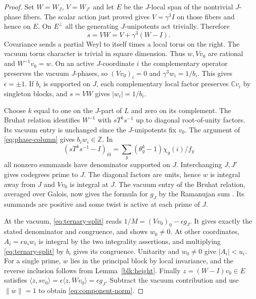 \documentclass[11pt]{amsart}
\numberwithin{equation}{section}
\theoremstyle{definition}
\theoremstyle{plain}
\begin{document}
\begin{proof}
Set $W=W_J$, $V=W_{J'}$ and let $E$ be the $J$-local span of
the nontrivial $J$-phase fibers. The scalar action just proved gives
$V=\gamma^3 I$ on those fibers and hence on $E$. On $E^\perp$ all
the generating $J$-unipotents act trivially. Therefore
\begin{equation}\label{eq:ternary-split}
 s=VW=V+\gamma^3(W-I).
\end{equation}
Covariance sends a partial Weyl to itself times a local torus on the
right. The vacuum torus character is trivial in square dimension.
Thus $w,Vv_0$ are rational and $W^{-1}v_0=w$. On an active
$J$-coordinate $i$ the complementary operator preserves the vacuum
$J$-phases, so $(Vv_0)_i=0$ and $\gamma^3 w_i=1/b_i$. This gives
$\epsilon=\pm1$. If $b_i$ is supported on $J$, each complementary
local factor preserves $\mathbb C v_i$ by singleton blocks, and
$s=VW$ gives $|w_i|=1/b_i$.

Choose $k$ equal to one on the $J$-part of $L$ and zero on its
complement. The Bruhat relation identifies $W^{-1}$ with
$sT^ks^{-1}$ up to diagonal root-of-unity factors. Its vacuum entry
is unchanged since the $J$-unipotents fix $v_0$. The argument
of \eqref{eq:phase-column} gives $b_iw_i\in\mathbb Z$. In
\[
 (sT^ks^{-1}-I)_{i0}=\sum_y(\theta_y^k-1)\chi_y(i)/f_y
\]
all nonzero summands have denominator supported on $J$.
Interchanging $J,J'$ gives codegrees prime to $J$. The diagonal
factors are units, hence $w$ is integral away from $J$ and $Vv_0$
is integral at $J$. The vacuum entry of the Bruhat relation, averaged
over Galois, now gives the formula for $g_J$ by the Ramanujan sum
\cite[Theorem~8.6]{Apostol}. Its summands are positive and some
twist is active at each prime of $J$.

At the vacuum, \eqref{eq:ternary-split} reads
$1/M=(Vv_0)_0-\epsilon g_J$. It gives exactly the stated denominator
and congruence, and shows $w_0\ne0$. At other coordinates,
$A_i=\epsilon u_iw_i$ is integral by the two integrality assertions,
and multiplying \eqref{eq:ternary-split} by $b_i$ gives its
congruence. Unitarity and $w_0\ne0$ give $|A_i|<u_i$. For a single
prime, $w$ lies in the principal block by local invariance, and the
reverse inclusion follows from Lemma~\ref{blk:height}.
Finally $z=(W-I)v_0\in E$ satisfies
$\langle z,sv_0\rangle=\epsilon\langle z,Wv_0\rangle
=\epsilon g_J$. Subtract the vacuum contribution and use
$\|w\|=1$ to obtain \eqref{eq:component-norm}.
\end{proof}
\end{document}
